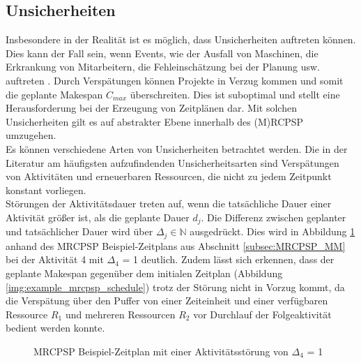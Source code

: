 \subsection{Unsicherheiten} \label{subsec:MRCPSP_Unsicherheiten}

Insbesondere in der Realität ist es möglich, dass Unsicherheiten auftreten können. Dies kann der Fall sein, wenn Events, wie der Ausfall von Maschinen, die Erkrankung von Mitarbeitern, die Fehleinschätzung bei der Planung usw. auftreten \cite[vgl.][S. 64 ff.]{deblaere_reactive_2011}. Durch Verspätungen können Projekte in Verzug kommen und somit die geplante Makespan $C_{max}$ überschreiten. Dies ist suboptimal und stellt eine Herausforderung bei der Erzeugung von Zeitplänen dar. Mit solchen Unsicherheiten gilt es auf abstrakter Ebene innerhalb des (M)RCPSP umzugehen. \\

Es können verschiedene Arten von Unsicherheiten betrachtet werden. Die in der Literatur am häufigsten aufzufindenden Unsicherheitsarten sind Verspätungen von Aktivitäten und erneuerbaren Ressourcen, die nicht zu jedem Zeitpunkt konstant vorliegen. \cite[vgl.][S. 64 ff.]{deblaere_reactive_2011} \\

Störungen der Aktivitätsdauer treten auf, wenn die tatsächliche Dauer einer Aktivität größer ist, als die geplante Dauer $d_j$. Die Differenz zwischen geplanter und tatsächlicher Dauer wird über $\Delta_j \in \mathbb{N}$ ausgedrückt. \cite[vgl.][S. 65]{deblaere_reactive_2011} Dies wird in Abbildung \ref{img:example_mrcpsp_schedule_activitydisturbance} anhand des MRCPSP Beispiel-Zeitplans aus Abschnitt \ref{subsec:MRCPSP_MM} bei der Aktivität 4 mit $\Delta_4$ = 1 deutlich. Zudem lässt sich erkennen, dass der geplante Makespan gegenüber dem initialen Zeitplan (Abbildung \ref{img:example_mrcpsp_schedule}) trotz der Störung nicht in Vorzug kommt, da die Verspätung über den Puffer von einer Zeiteinheit und einer verfügbaren Ressource $R_1$ und mehreren Ressourcen $R_2$ vor Durchlauf der Folgeaktivität bedient werden konnte. 

\begin{figure}[H]
    \centering
    \noindent{}
    \caption{MRCPSP Beispiel-Zeitplan mit einer Aktivitätsstörung von $\Delta_4$ = 1} 
    \label{img:example_mrcpsp_schedule_activitydisturbance}
\end{figure}


